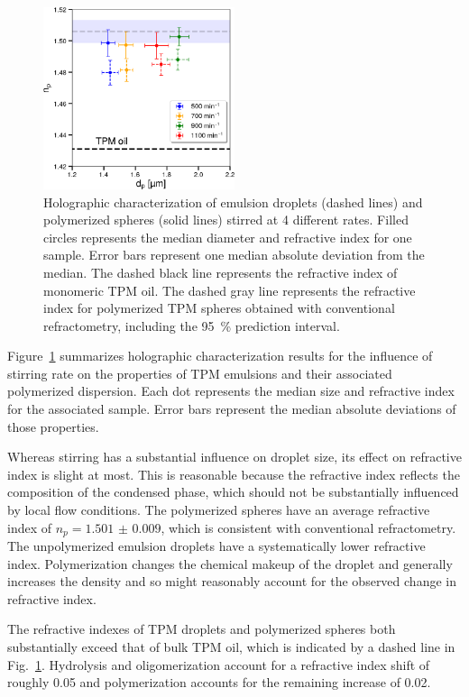\documentclass[journal=langd5,manuscript=article]{achemso}
\begin{document}
\begin{figure}
  \centering
  \includegraphics[width=0.5\textwidth]{jointspeed}
  \caption{Holographic characterization of emulsion droplets
    (dashed lines) and polymerized spheres (solid lines)
    stirred at \num{4} different rates.
    Filled circles represents the median diameter and refractive index
    for one sample.  Error bars represent one median absolute 
    deviation from the median.
    The dashed black line represents the refractive index of monomeric
    TPM oil.
    The dashed gray line represents the refractive index for polymerized
    TPM spheres obtained with conventional refractometry, including
    the \SI{95}{\percent} prediction interval.}
  \label{fig:jointspeed}
\end{figure}

Figure~\ref{fig:jointspeed} summarizes holographic characterization
results for the influence of stirring rate on the properties of TPM
emulsions and their associated polymerized dispersion.
Each dot represents the median size and refractive index for the associated sample.
Error bars represent the median absolute deviations of those properties.

Whereas stirring has a substantial influence on droplet size,
its effect on refractive index is slight at most.
This is reasonable because the refractive index reflects
the composition of the condensed phase, which should not
be substantially influenced by local flow conditions.
The polymerized spheres have an average refractive index of
$n_p = \num{1.501(9)}$, which is consistent with conventional
refractometry.
The unpolymerized emulsion droplets have a systematically 
lower refractive index.
Polymerization changes the chemical makeup of the droplet and
generally increases the density %
and so might reasonably account for the observed change in refractive index.

The refractive indexes of TPM droplets and polymerized spheres both
substantially exceed that of bulk TPM oil, which is indicated by
a dashed line in Fig.~\ref{fig:jointspeed}.
Hydrolysis and oligomerization account for a refractive
index shift of roughly \num{0.05} and polymerization accounts for the remaining
increase of \num{0.02}.
\end{document}
